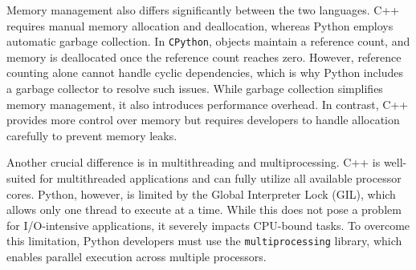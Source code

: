 Memory management also differs significantly between the two languages. C++ requires manual memory allocation and deallocation, whereas Python employs automatic garbage collection. In \texttt{CPython}, objects maintain a reference count, and memory is deallocated once the reference count reaches zero. However, reference counting alone cannot handle cyclic dependencies, which is why Python includes a garbage collector to resolve such issues. While garbage collection simplifies memory management, it also introduces performance overhead. In contrast, C++ provides more control over memory but requires developers to handle allocation carefully to prevent memory leaks.\cite{python-gc}

Another crucial difference is in multithreading and multiprocessing. C++ is well-suited for multithreaded applications and can fully utilize all available processor cores. Python, however, is limited by the Global Interpreter Lock (GIL), which allows only one thread to execute at a time. While this does not pose a problem for \ac{I/O}-intensive applications, it severely impacts CPU-bound tasks. To overcome this limitation, Python developers must use the \texttt{multiprocessing} library, which enables parallel execution across multiple processors.\parencite{python-threading}

